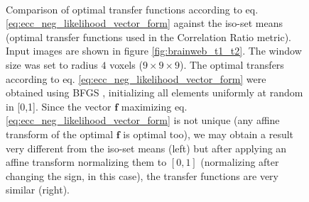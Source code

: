 \begin{figure}[H]
\centering
    \\
    \caption{Comparison of optimal transfer functions according to eq. \eqref{eq:ecc_neg_likelihood_vector_form} against the iso-set means (optimal transfer functions used in the Correlation Ratio metric). Input images are shown in figure \ref{fig:brainweb_t1_t2}. The window size was set to radius $4$ voxels ($9\times 9\times 9$). The optimal transfers according to eq. \eqref{eq:ecc_neg_likelihood_vector_form} were obtained using BFGS \citep{GVK502988711}, initializing all elements uniformly at random in [0,1]. Since the vector $\mathbf{f}$ maximizing eq. \eqref{eq:ecc_neg_likelihood_vector_form} is not unique (any affine transform of the optimal $\mathbf{f}$ is optimal too), we may obtain a result very different from the iso-set means (left) but after applying an affine transform normalizing them to $[0,1]$ (normalizing after changing the sign, in this case), the transfer functions are very similar (right).}
\label{fig:comparison_optimal_transfers}
\end{figure}

